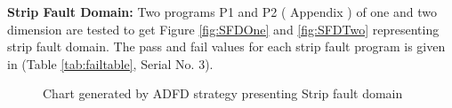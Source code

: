 \documentclass[runningheads,a4paper]{llncs}
\begin{document}



\textbf{Strip Fault Domain:} Two programs P1 and P2 ( Appendix ) of one and two dimension are tested to get Figure \ref{fig:SFDOne} and \ref{fig:SFDTwo} representing strip fault domain. The pass and fail values for each strip fault program is given in (Table \ref{tab:failtable}, Serial No. 3).



%
\begin{figure} [H]



\caption{Chart generated by ADFD strategy presenting Strip fault domain}
\end{figure}






\end{document}
